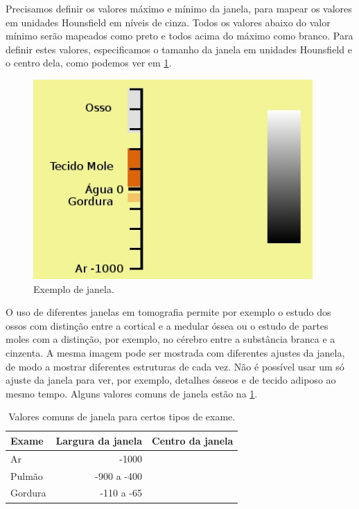 Precisamos definir os valores máximo e mínimo da janela, para mapear os valores em unidades Hounsfield em níveis de cinza. Todos os valores abaixo do valor mínimo serão mapeados como preto e todos acima do máximo como branco. Para definir estes valores, especificamos o tamanho da janela em unidades Hounsfield e o centro dela, como podemos ver em \ref{fig:tc_janela}.

\begin{figure}[ht]
 \begin{center}
  \includegraphics[height=3.0in]{imagens/tc_janela.jpg}
 \end{center}
 \caption{Exemplo de janela.}
 \label{fig:tc_janela}
\end{figure}

O uso de diferentes janelas em tomografia permite por exemplo o estudo dos ossos com distinção entre a cortical e a medular óssea ou o estudo de partes moles com a distinção, por exemplo, no cérebro entre a substância branca e a cinzenta. A mesma imagem pode ser mostrada com diferentes ajustes da janela, de modo a mostrar diferentes estruturas de cada vez. Não é possível usar um só ajuste da janela para ver, por exemplo, detalhes ósseos e de tecido adiposo ao mesmo tempo. Alguns valores comuns de janela estão na \ref{tab:janela}.

\begin{table}
 \label{tab:janela}
 \caption{Valores comuns de janela para certos tipos de exame.}
 \begin{center}
 \begin{tabular}{|l|r|r|}
 \hline
 	\textbf{Exame} & \textbf{Largura da janela} & \textbf{Centro da janela} \\ \hline
 	Ar & -1000 \\ \hline
 	Pulmão & -900 a -400 \\ \hline
 	Gordura & -110 a -65 \\
 \hline
 \end{tabular}
 \end{center}
\end{table}

